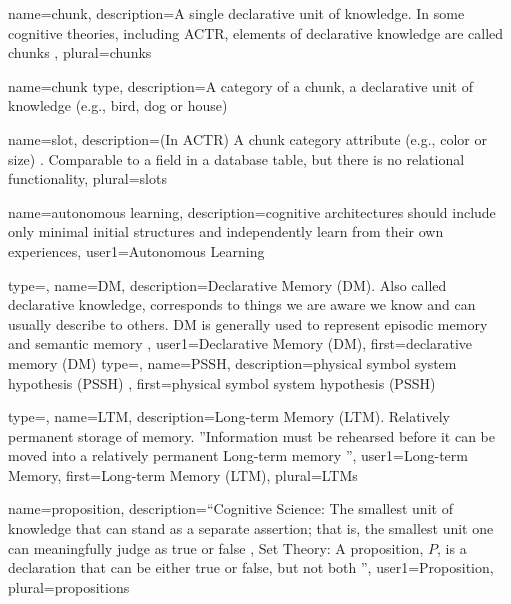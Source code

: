 {
  name=chunk,
  description={A single declarative unit of knowledge. In some cognitive theories, including \gls{ACTR}, elements of declarative knowledge are called chunks \citep{anderson2004integrated}},
  plural=chunks
}

{
  name=chunk type,
  description={A category of a chunk, a declarative unit of knowledge (e.g., bird, dog or house) \citep{anderson2004integrated}}
}

{
  name=slot,
  description={(In \gls{ACTR}) A chunk category attribute (e.g., color or size) \citep{anderson2004integrated}.  Comparable to a field in a database table, but there is no relational functionality},
  plural=slots
}

{
  name=autonomous learning,
  description={\Glspl{cognitive architecture} should include only minimal initial structures and independently learn from their own experiences\citep{sun2004desiderata}},
  user1={Autonomous Learning}
}

{
  type=\acronymtype,
  name=DM,
  description={Declarative Memory (DM). Also called declarative knowledge, corresponds to things we are aware we know and can usually describe to others. \gls{DM} is generally used to represent episodic memory and \gls{semantic memory}  \citep{Anderson2007HowCan}},
  user1={Declarative Memory (DM)},
  first={declarative memory (DM)}
}
{
  type=\acronymtype,
  name=PSSH,
  description={physical symbol system hypothesis (PSSH) \citep{newell1961computer}},
  first={physical symbol system hypothesis (PSSH)}
}

{
  type=\acronymtype,
  name=LTM,
  description={Long-term Memory (LTM). Relatively permanent storage of memory. ''Information must be rehearsed before it can be moved into a relatively permanent Long-term memory \citep[176]{anderson2005cognitive} ''},
  user1={Long-term Memory},
  first={Long-term Memory (LTM)},
  plural={LTMs}
}

{
    name=proposition,
    description={``Cognitive Science: The smallest unit of knowledge that can stand as a separate assertion; that is, the smallest unit one can meaningfully judge as true or false \citep[147]{anderson2005cognitive},
    \newline
    \newline
    Set Theory: A proposition, $P$, is a declaration that can be either true or false, but not both \citep{johnson2013hypernetworks}''},
    user1={Proposition},
    plural={propositions}
}

